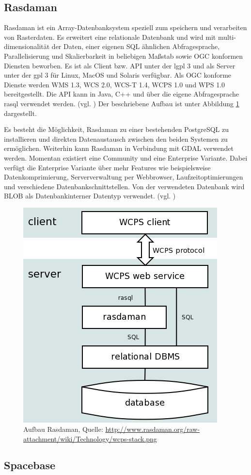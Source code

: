 \subsection{Rasdaman}

Rasdaman ist ein Array-Datenbanksystem speziell zum speichern und verarbeiten von Rasterdaten.
Es erweitert eine relationale Datenbank und wird mit  multi-dimensionalität der Daten, einer eigenen SQL ähnlichen Abfragesprache, Parallelisierung und Skalierbarkeit in beliebigen Maßstab sowie OGC konformen Diensten beworben.
Es ist als Client bzw. API unter der \Gls{lgpl} 3 und als Server unter der \Gls{gpl} 3 für Linux, MacOS und Solaris verfügbar.
Als OGC konforme Dienste werden WMS 1.3, WCS 2.0, WCS-T 1.4, WCPS 1.0 und WPS 1.0 bereitgestellt.
Die API kann in Java, C++ und über die eigene Abfragesprache rasql verwendet werden. (vgl. \cite{website:rasdamanogeo})
Der beschriebene Aufbau ist unter Abbildung \ref{fig:rasdaman} dargestellt.

Es besteht die Möglichkeit, Rasdaman zu einer bestehenden PostgreSQL zu installieren und direkten Datenaustausch zwischen den beiden Systemen zu ermöglichen.
Weiterhin kann Rasdaman in Verbindung mit GDAL verwendet werden.
Momentan existiert eine Community und eine Enterprise Variante. Dabei verfügt die Enterprise Variante über mehr Features wie beispielsweise Datenkomprimierung, Serververwaltung per Webbrowser, Laufzeitoptimierungen und verschiedene Datenbankschnittstellen.
Von der verwendeten Datenbank wird BLOB als Datenbankinterner Datentyp verwendet. (vgl. \cite{website:rasdamanowiki})
\begin{figure}[h]
\centering
\includegraphics[width=.4\textwidth]{Abbildungen/rasdaman-aufbau.png}
\caption[Aufbau Rasdaman]{Aufbau Rasdaman, Quelle: \url{http://www.rasdaman.org/raw-attachment/wiki/Technology/wcps-stack.png}}
\label{fig:rasdaman}
\end{figure}

\subsection{Spacebase}

